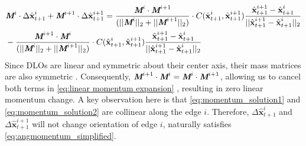 \begin{align}
    \label{eq:linear momentum expansion}
    \begin{split}
     & \textit{\textbf{M}}^i \cdot \Delta \hat{\textbf{x}}^i_{t+1} + \textit{\textbf{M}}^{i+1} \cdot \Delta \hat{\textbf{x}}^{i+1}_{t+1}=  
     \frac{\textit{\textbf{M}}^{i} \cdot \textit{\textbf{M}}^{i+1}}{(||\textit{\textbf{M}}^{i}||_2+||\textit{\textbf{M}}^{i+1}||_2)} \cdot C(\hat{\textbf{x}}^i_{t+1},\hat{\textbf{x}}^{i+1}_{t+1})\frac{\hat{\textbf{x}}^{i+1}_{t+1} - \hat{\textbf{x}}^{i}_{t+1}}{||\hat{\textbf{x}}^{i+1}_{t+1} - \hat{\textbf{x}}^{i}_{t+1}||_2} \\
     & - \frac{\textit{\textbf{M}}^{i+1} \cdot \textit{\textbf{M}}^{i}}{(||\textit{\textbf{M}}^{i}||_2 + ||\textit{\textbf{M}}^{i+1}||_2)}\cdot C(\hat{\textbf{x}}^i_{t+1},\hat{\textbf{x}}^{i+1}_{t+1})\frac{\hat{\textbf{x}}^{i+1}_{t+1} - \hat{\textbf{x}}^{i}_{t+1}}{||\hat{\textbf{x}}^{i+1}_{t+1} - \hat{\textbf{x}}^{i}_{t+1}||_2}
     \end{split}   
\end{align}
Since DLOs are linear and symmetric about their center axis, their mass matrices are also symmetric \cite{massmatrices}. Consequently, $\textit{\textbf{M}}^{i+1} \cdot \textit{\textbf{M}}^{i} = \textit{\textbf{M}}^{i} \cdot \textit{\textbf{M}}^{i+1}$,  allowing us to cancel both terms in \eqref{eq:linear momentum expansion} , resulting in zero linear momentum change. 
A key observation here is that \eqref{eq:momentum_solution1} and \eqref{eq:momentum_solution2} are collinear along the edge $i$. 
Therefore, $\Delta \hat{\textbf{x}}^i_{t+1}$ and $\Delta \hat{\textbf{x}}^{i+1}_{t+1}$ will not change orientation of edge $i$, naturally satisfies \eqref{eq:angmomentum_simplified}.